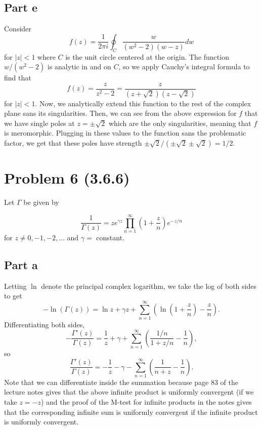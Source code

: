 \documentclass{article}
\begin{document}
\subsection{Part e}
Consider 
\[
f(z)=\frac{1}{2 \pi i} \oint_C \frac{w}{(w^2 - 2)(w -z)} d w
\]
for $|z| < 1$ where $C$ is the unit circle centered at the origin. The function $w/(w^2-2)$ is analytic in and on $C$, so we apply Cauchy's integral formula to find that
\[
f(z)=\frac{z}{z^2-2}=\frac{z}{(z+\sqrt{2})(z-\sqrt{2})}
\]
for $|z| < 1$. Now, we analytically extend this function to the rest of the complex plane sans its singularities. Then, we can see from the above expression for $f$ that we have single poles at $z=\pm\sqrt{2}$ which are the only singularities, meaning that $f$ is meromorphic. Plugging in these values to the function sans the problematic factor, we get that these poles have strength $\pm\sqrt{2}/(\pm\sqrt{2}\pm\sqrt{2})=1/2$.  

\section{Problem 6 (3.6.6)}
 Let $\Gamma$ be given by

	\[
	\frac{1}{\Gamma(z)} = z e^{\gamma z} \prod_{n=1}^\infty \left(1 + \frac{z}{n}\right) e^{-z/n}
	\]
	for $z \neq 0,-1,-2,\ldots$ and $\gamma = $ constant.
\subsection{Part a}
Letting $\ln$ denote the principal complex logarithm, we take the log of both sides to get
\[
-\ln(\Gamma(z))=\ln{z}+\gamma z+\sum_{n=1}^\infty\left(\ln\left(1+\frac{z}{n}\right)-\frac{z}{n}\right).
\]
Differentiating both sides, 
\[
-\frac{\Gamma'(z)}{\Gamma(z)}=\frac{1}{z}+\gamma+\sum_{n=1}^\infty\left(\frac{1/n}{1+z/n}-\frac{1}{n}\right),
\]
so
\[
\frac{\Gamma'(z)}{\Gamma(z)}=-\frac{1}{z}-\gamma-\sum_{n=1}^\infty\left(\frac{1}{n+z}-\frac{1}{n}\right).
\]
Note that we can differentiate inside the summation because page 83 of the lecture notes gives that the above infinite product is uniformly convergent (if we take $z=-z$) and the proof of the M-test for infinite products in the notes gives that the corresponding infinite sum is uniformly convergent if the infinite product is uniformly convergent. 
\end{document}
